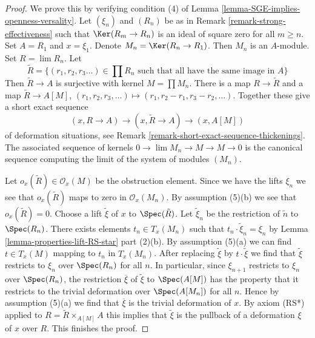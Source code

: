 \begin{proof}
We prove this by verifying condition (4) of
Lemma \ref{lemma-SGE-implies-openness-versality}.
Let $(\xi_n)$ and $(R_n)$ be as in Remark \ref{remark-strong-effectiveness}
such that $\Ker(R_m \to R_n)$ is an ideal of square zero
for all $m \geq n$. Set $A = R_1$ and $x = \xi_1$.
Denote $M_n = \Ker(R_n \to R_1)$.
Then $M_n$ is an $A$-module. Set $R = \lim R_n$.
Let
$$
\tilde R = \{(r_1, r_2, r_3 \ldots) \in \prod R_n
\text{ such that all have the same image in }A\}
$$
Then $\tilde R \to A$ is surjective with kernel $M = \prod M_n$.
There is a map $R \to \tilde R$ and a map
$\tilde R \to A[M]$, $(r_1, r_2, r_3, \ldots) \mapsto
(r_1, r_2 - r_1, r_3 - r_2, \ldots)$.
Together these give a short exact sequence
$$
(x, R \to A) \to (x, \tilde R \to A) \to (x, A[M])
$$
of deformation situations, see
Remark \ref{remark-short-exact-sequence-thickenings}.
The associated sequence of kernels
$0 \to \lim M_n \to M \to M \to 0$
is the canonical sequence computing the limit
of the system of modules $(M_n)$.

\medskip\noindent
Let $o_x(\tilde R) \in \mathcal{O}_x(M)$ be the obstruction element.
Since we have the lifts $\xi_n$ we see that $o_x(\tilde R)$
maps to zero in $\mathcal{O}_x(M_n)$. By assumption (5)(b)
we see that $o_x(\tilde R) = 0$. Choose a lift $\tilde \xi$
of $x$ to $\Spec(\tilde R)$. Let $\tilde \xi_n$ be the
restriction of $\tilde n$ to $\Spec(R_n)$. There exists
elements $t_n \in T_x(M_n)$ such that
$t_n \cdot \tilde \xi_n = \xi_n$ by
Lemma \ref{lemma-properties-lift-RS-star} part (2)(b).
By assumption (5)(a) we can find $t \in T_x(M)$
mapping to $t_n$ in $T_x(M_n)$. After replacing
$\tilde \xi$ by $t \cdot \tilde \xi$ we find that
$\tilde \xi$ restricts to $\xi_n$ over $\Spec(R_n)$ for all $n$.
In particular, since $\xi_{n + 1}$ restricts to $\xi_n$
over $\Spec(R_n)$, the restriction $\overline{\xi}$ of $\tilde \xi$
to $\Spec(A[M])$ has the property that it restricts to
the trivial deformation over $\Spec(A[M_n])$ for all $n$.
Hence by assumption (5)(a) we find that $\overline{\xi}$
is the trivial deformation of $x$. By axiom (RS*)
applied to $R = \tilde R \times_{A[M]} A$
this implies that $\tilde \xi$ is the pullback
of a deformation $\xi$ of $x$ over $R$. This finishes the proof.
\end{proof}

